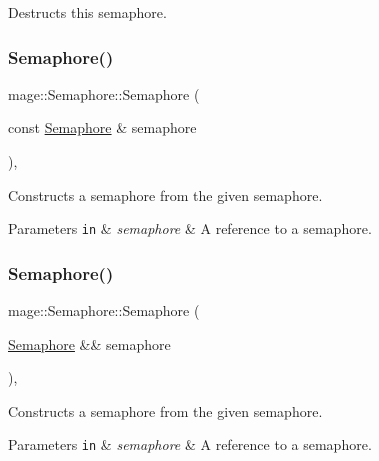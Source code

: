 Destructs this semaphore. \hypertarget{classmage_1_1_semaphore_a8873b2ed82ff66d323a8c3cebf0fb5c0}{}\label{classmage_1_1_semaphore_a8873b2ed82ff66d323a8c3cebf0fb5c0} 
\subsubsection{\texorpdfstring{Semaphore()}{Semaphore()}\hspace{0.1cm}{\footnotesize\ttfamily [2/3]}}
{\footnotesize\ttfamily mage\+::\+Semaphore\+::\+Semaphore (\begin{DoxyParamCaption}\item[{const \hyperlink{classmage_1_1_semaphore}{Semaphore} \&}]{semaphore }\end{DoxyParamCaption})\hspace{0.3cm}{\ttfamily [private]}, {\ttfamily [delete]}}

Constructs a semaphore from the given semaphore.


\begin{DoxyParams}[1]{Parameters}
\mbox{\tt in}  & {\em semaphore} & A reference to a semaphore. \\
\hline
\end{DoxyParams}
\hypertarget{classmage_1_1_semaphore_a48c70e46bdfd206556a93ae96ad760a5}{}\label{classmage_1_1_semaphore_a48c70e46bdfd206556a93ae96ad760a5} 
\subsubsection{\texorpdfstring{Semaphore()}{Semaphore()}\hspace{0.1cm}{\footnotesize\ttfamily [3/3]}}
{\footnotesize\ttfamily mage\+::\+Semaphore\+::\+Semaphore (\begin{DoxyParamCaption}\item[{\hyperlink{classmage_1_1_semaphore}{Semaphore} \&\&}]{semaphore }\end{DoxyParamCaption})\hspace{0.3cm}{\ttfamily [private]}, {\ttfamily [delete]}}

Constructs a semaphore from the given semaphore.


\begin{DoxyParams}[1]{Parameters}
\mbox{\tt in}  & {\em semaphore} & A reference to a semaphore. \\
\hline
\end{DoxyParams}



